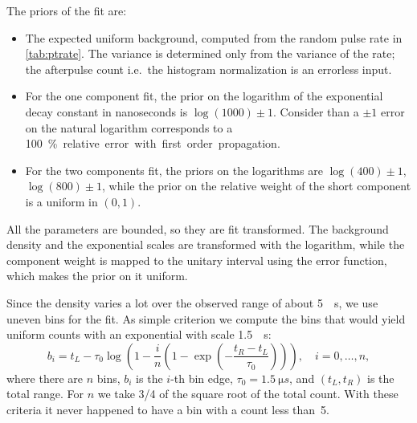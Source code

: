 The priors of the fit are:
%
\begin{itemize}
    
    \item The expected uniform background, computed from the random pulse rate
    in \autoref{tab:ptrate}. The variance is determined only from the variance
    of the rate; the afterpulse count i.e.\ the histogram normalization is an
    errorless input.
    
    \item For the one component fit, the prior on the logarithm of the
    exponential decay constant in nanoseconds is $\log(1000) \pm 1$. Consider
    than a $\pm 1$ error on the natural logarithm corresponds to a \SI{100}\%
    relative error with first order propagation.
    
    \item For the two components fit, the priors on the logarithms are
    $\log(400) \pm 1$, $\log(800) \pm 1$, while the prior on the relative
    weight of the short component is a uniform in $(0, 1)$.
    
\end{itemize}

All the parameters are bounded, so they are fit transformed. The background
density and the exponential scales are transformed with the logarithm, while
the component weight is mapped to the unitary interval using the error
function, which makes the prior on it uniform.

Since the density varies a lot over the observed range of about \SI{5}{\micro
s}, we use uneven bins for the fit. As simple criterion we compute the bins
that would yield uniform counts with an exponential with scale \SI{1.5}{\micro
s}:
%
\begin{equation}
    b_i = t_L - \tau_0 \log\left(1 - \frac in
    \left(1 - \exp\left(-\frac{t_R - t_L}{\tau_0}\right)\right)\right),
    \quad i = 0, \ldots, n,
\end{equation}
%
where there are $n$ bins, $b_i$ is the $i$-th bin edge, $\tau_0 =
\SI{1.5}{\micro s}$, and $(t_L, t_R)$ is the total range. For $n$ we take 3/4
of the square root of the total count. With these criteria it never happened
to have a bin with a count less than~5.

